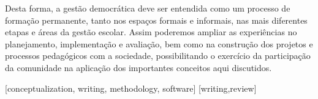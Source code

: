 \documentclass[portuguese]{textolivre}
\begin{document}
Desta forma, a gestão democrática deve ser entendida como um processo de formação permanente, tanto nos espaços formais e informais, nas mais diferentes etapas e áreas da gestão escolar. Assim poderemos ampliar as experiências no planejamento, implementação e avaliação, bem como na construção dos projetos e processos pedagógicos com a sociedade, possibilitando o exercício da participação da comunidade na aplicação dos importantes conceitos aqui discutidos.



\printbibliography\label{sec-bib}


\begin{contributors}
[conceptualization, writing, methodology, software]
[writing,review]
\end{contributors}
\end{document}
